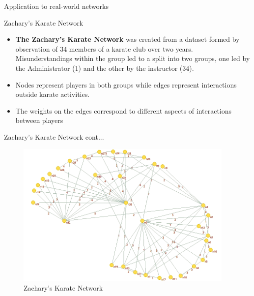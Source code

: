 \documentclass[10pt]{beamer}
\begin{document}
\begin{frame}{Application to real-world networks}
	\begin{block}{Zachary's Karate Network}
		\begin{itemize}
			\item \textbf{The Zachary's Karate Network} was created from a dataset formed by observation of $34$ members of a karate club over two years. Misunderstandings within the group led to a split into two groups, one led by the Administrator ($1$) and the other by the instructor ($34$).
			\vspace{0.2cm}
			\item Nodes represent players in both groups while edges represent interactions outside karate activities.
			\vspace{0.2cm}
			\item The weights on the edges correspond to different aspects of interactions between players	
			
		\end{itemize}
		
	\end{block}
\end{frame}

\begin{frame}{Zachary's Karate Network cont...}
	\begin{figure}[!h]
		\includegraphics[width=0.95\textwidth]{images/zachvisual.png}
		\caption{Zachary's Karate Network}
	\end{figure}
\end{frame}
\end{document}
